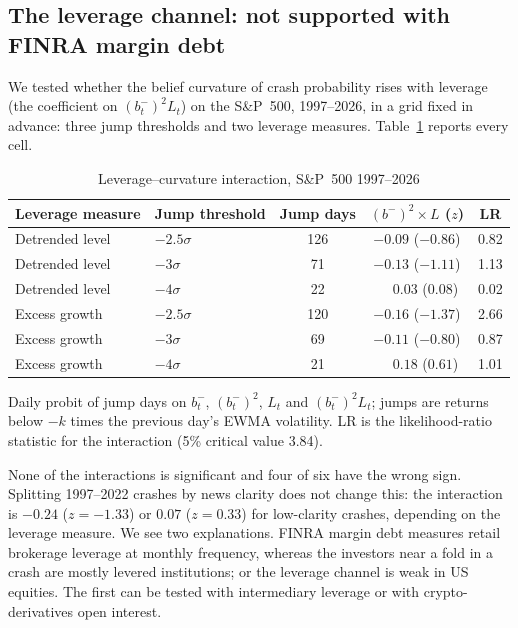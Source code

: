 \documentclass[11pt,a4paper]{article}
\theoremstyle{remark}
\begin{document}
\subsection{The leverage channel: not supported with FINRA margin debt}

We tested whether the belief curvature of crash probability rises with leverage (the
coefficient on $(b^-_t)^2L_t$) on the S\&P~500, 1997--2026, in a grid fixed in advance: three
jump thresholds and two leverage measures. Table~\ref{tab:lev} reports every cell.

\begin{table}[ht]
\centering
\begin{threeparttable}
\caption{Leverage--curvature interaction, S\&P~500 1997--2026}
\label{tab:lev}
\small
\begin{tabular}{llccc}
\toprule
Leverage measure & Jump threshold & Jump days & $(b^-)^2\times L$ ($z$) & LR \\
\midrule
Detrended level & $-2.5\sigma$ & 126 & $-0.09$ ($-0.86$) & 0.82 \\
Detrended level & $-3\sigma$ & 71 & $-0.13$ ($-1.11$) & 1.13 \\
Detrended level & $-4\sigma$ & 22 & $\phantom{-}0.03$ ($0.08$) & 0.02 \\
Excess growth & $-2.5\sigma$ & 120 & $-0.16$ ($-1.37$) & 2.66 \\
Excess growth & $-3\sigma$ & 69 & $-0.11$ ($-0.80$) & 0.87 \\
Excess growth & $-4\sigma$ & 21 & $\phantom{-}0.18$ ($0.61$) & 1.01 \\
\bottomrule
\end{tabular}
\begin{tablenotes}\footnotesize
\item Daily probit of jump days on $b^-_t$, $(b^-_t)^2$, $L_t$ and $(b^-_t)^2L_t$; jumps
are returns below $-k$ times the previous day's EWMA volatility. LR is the likelihood-ratio
statistic for the interaction (5\% critical value 3.84).
\end{tablenotes}
\end{threeparttable}
\end{table}

None of the interactions is significant and four of six have the wrong sign. Splitting
1997--2022 crashes by news clarity does not change this: the interaction is $-0.24$
($z=-1.33$) or $0.07$ ($z=0.33$) for low-clarity crashes, depending on the leverage measure.
We see two explanations. FINRA margin debt measures retail brokerage leverage at monthly
frequency, whereas the investors near a fold in a crash are mostly levered institutions;
or the leverage channel is weak in US equities. The first can be tested with intermediary
leverage \citep{AdrianEtulaMuir2014} or with crypto-derivatives open interest.
\end{document}
